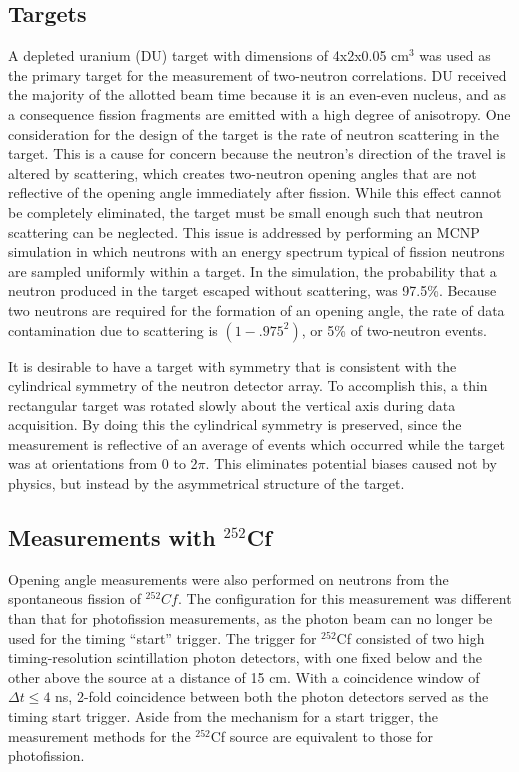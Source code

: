 \subsection{Targets}
A depleted uranium (DU) target with dimensions of 4x2x0.05 $\text{cm}^3$ was used as the primary target for the measurement of two-neutron correlations.
DU received the majority of the allotted beam time because it is an even-even nucleus, and as a consequence fission fragments are emitted with a high degree of anisotropy.
One consideration for the design of the target is the rate of neutron scattering in the target.
This is a cause for concern because the neutron's direction of the travel is altered by scattering, which creates two-neutron opening angles that are not reflective of the opening angle immediately after fission.
While this effect cannot be completely eliminated, the target must be small enough such that neutron scattering can be neglected.
This issue is addressed by performing an MCNP simulation in which neutrons with an energy spectrum typical of fission neutrons are sampled uniformly within a target.
In the simulation, the probability that a neutron produced in the target escaped without scattering, was 97.5\%.
Because two neutrons are required for the formation of an opening angle, the rate of data contamination due to scattering is $(1-.975^2)$, or 5\% of two-neutron events.

It is desirable to have a target with symmetry that is consistent with the cylindrical symmetry of the neutron detector array.
To accomplish this, a thin rectangular target was rotated slowly about the vertical axis during data acquisition.
By doing this the cylindrical symmetry is preserved, since the measurement is reflective of an average of events which occurred while the target was at orientations from 0 to 2$\pi$.
This eliminates potential biases caused not by physics, but instead by the asymmetrical structure of the target.

\subsection{Measurements with $^{252}$Cf}

Opening angle measurements were also performed on neutrons from the spontaneous fission of $^{252}Cf$.
The configuration for this measurement was different than that for photofission measurements, as the photon beam can no longer be used for the timing ``start'' trigger.
The trigger for $^{252}$Cf consisted of two high timing-resolution scintillation photon detectors, with one fixed below and the other above the source at a distance of 15 cm.
With a coincidence window of $\Delta t\leq 4$ ns, 2-fold coincidence between both the photon detectors served as the timing start trigger.
Aside from the mechanism for a start trigger, the measurement methods for the $^{252}$Cf source are equivalent to those for photofission.

